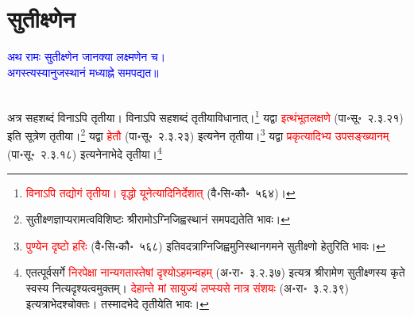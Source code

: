 \section[सुतीक्ष्णेन]{सुतीक्ष्णेन}
\centering\textcolor{blue}{अथ रामः सुतीक्ष्णेन जानक्या लक्ष्मणेन च।\nopagebreak\\
अगस्त्यस्यानुजस्थानं मध्याह्ने समपद्यत॥}\nopagebreak\\
\\
\begin{sloppypar}\justifying\noindent\hspace{10mm} अत्र सह\-शब्दं विनाऽपि तृतीया। विनाऽपि सह\-शब्दं तृतीया\-विधानात्।\footnote{\textcolor{red}{विनाऽपि तद्योगं तृतीया। वृद्धो यूनेत्यादिनिर्देशात्‌} (वै॰सि॰कौ॰~५६४)।} यद्वा \textcolor{red}{इत्थं\-भूत\-लक्षणे} (पा॰सू॰~२.३.२१) इति सूत्रेण तृतीया।\footnote{सुतीक्ष्ण\-ज्ञाप्य\-रामत्व\-विशिष्टः श्रीरामोऽग्निजिह्व\-स्थानं समपद्यतेति भावः।} यद्वा \textcolor{red}{हेतौ} (पा॰सू॰~२.३.२३) इत्यनेन तृतीया।\footnote{\textcolor{red}{पुण्येन दृष्टो हरिः} (वै॰सि॰कौ॰~५६८) इतिवदत्राग्निजिह्व\-मुनि\-स्थान\-गमने सुतीक्ष्णो हेतुरिति भावः।} यद्वा \textcolor{red}{प्रकृत्यादिभ्य उप\-सङ्ख्यानम्‌} (पा॰सू॰~२.३.१८) इत्यनेनाभेदे तृतीया।\footnote{एतत्पूर्वसर्गे \textcolor{red}{निरपेक्षा नान्यगतास्तेषां दृश्योऽहमन्वहम्} (अ॰रा॰~३.२.३७) इत्यत्र श्रीरामेण सुतीक्ष्णस्य कृते स्वस्य नित्यदृश्यत्वमुक्तम्। \textcolor{red}{देहान्ते मां सायुज्यं लप्स्यसे नात्र संशयः} (अ॰रा॰~३.२.३९) इत्यत्राभेदश्चोक्तः। तस्मादभेदे तृतीयेति भावः।}\end{sloppypar}
